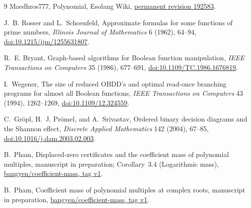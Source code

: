 \documentclass[11pt]{article}
\theoremstyle{remark}
\begin{document}
\begin{thebibliography}{9}
\small
{}
Maedhros777,
\newblock Polynomial,
\newblock Esolang Wiki,
\newblock \href{https://esolangs.org/w/index.php?title=Polynomial\&oldid=192583}
{permanent revision 192583}.

J.~B. Rosser and L.~Schoenfeld,
\newblock Approximate formulas for some functions of prime numbers,
\newblock \emph{Illinois Journal of Mathematics} 6 (1962), 64--94,
\newblock \href{https://doi.org/10.1215/ijm/1255631807}
{doi:10.1215/ijm/1255631807}.

R.~E. Bryant,
\newblock Graph-based algorithms for Boolean function manipulation,
\newblock \emph{IEEE Transactions on Computers} 35 (1986), 677--691,
\newblock \href{https://doi.org/10.1109/TC.1986.1676819}
{doi:10.1109/TC.1986.1676819}.

I.~Wegener,
\newblock The size of reduced OBDD's and optimal read-once branching programs
for almost all Boolean functions,
\newblock \emph{IEEE Transactions on Computers} 43 (1994), 1262--1269,
\newblock \href{https://doi.org/10.1109/12.324559}
{doi:10.1109/12.324559}.

C.~Gr\"opl, H.~J. Pr\"omel, and A.~Srivastav,
\newblock Ordered binary decision diagrams and the Shannon effect,
\newblock \emph{Discrete Applied Mathematics} 142 (2004), 67--85,
\newblock \href{https://doi.org/10.1016/j.dam.2003.02.003}
{doi:10.1016/j.dam.2003.02.003}.

B.~Pham,
\newblock Displaced-zero certificates and the coefficient mass of polynomial
multiples,
\newblock manuscript in preparation; Corollary~3.4 (Logarithmic mass),
\newblock \href{https://github.com/bangyen/coefficient-mass/blob/v1/coefficient-mass.tex}
{bangyen/coefficient-mass, tag v1}.

B.~Pham,
\newblock Coefficient mass of polynomial multiples at complex roots,
\newblock manuscript in preparation,
\newblock \href{https://github.com/bangyen/coefficient-mass/blob/v1/coefficient-mass-complex.tex}
{bangyen/coefficient-mass, tag v1}.

\end{thebibliography}
\end{document}
